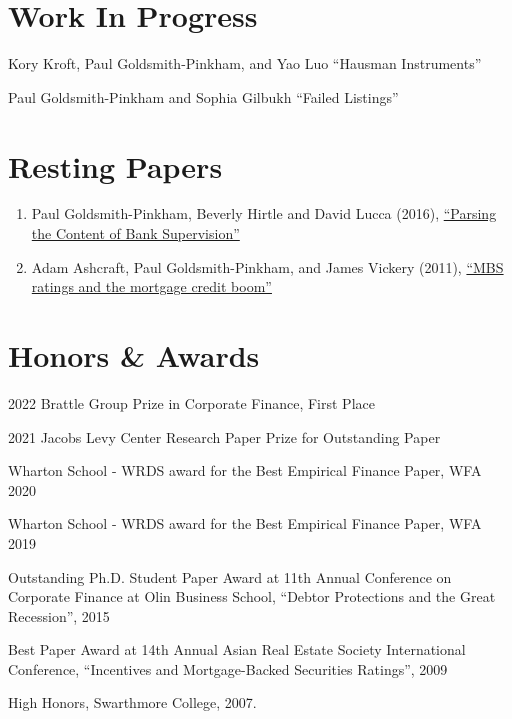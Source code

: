 \documentclass[letterpaper]{article}
\renewenvironment{itemize}{
  \begin{list}{}
    { \setlength{\itemsep}{5pt}
      \setlength{\parsep}{0pt}
      \setlength{\topsep}{0pt}
      \setlength{\leftmargin}{0em} } }{
  \end{list}}
\begin{document}
\section*{Work In Progress}
\begin{itemize}
	\item Kory Kroft, Paul Goldsmith-Pinkham, and Yao Luo ``Hausman Instruments''
	\item Paul Goldsmith-Pinkham and Sophia Gilbukh ``Failed Listings''
\end{itemize}

\section*{Resting Papers}
\begin{enumerate}
	\item Paul Goldsmith-Pinkham, Beverly Hirtle and David Lucca (2016), \href{https://www.newyorkfed.org/research/staff_reports/sr770.html}{``Parsing the Content of Bank Supervision''}
	\item Adam Ashcraft, Paul Goldsmith-Pinkham, and James Vickery (2011), \href{http://papers.ssrn.com/sol3/papers.cfm?abstract_id=1615613}{``MBS ratings and the mortgage credit boom''}
\end{enumerate}

\section*{Honors \& Awards}
\begin{itemize}
	\item 2022 Brattle Group Prize in Corporate Finance, First Place
	\item 2021 Jacobs Levy Center Research Paper Prize for Outstanding Paper
	\item Wharton School - WRDS award for the Best Empirical Finance Paper, WFA 2020
	\item Wharton School - WRDS award for the Best Empirical Finance Paper, WFA 2019
	\item Outstanding Ph.D. Student Paper Award at 11th Annual Conference
	      on Corporate Finance at Olin Business School, ``Debtor Protections
	      and the Great Recession'', 2015
	\item Best Paper Award at 14th Annual Asian Real Estate Society
	      International Conference, ``Incentives and Mortgage-Backed
	      Securities Ratings'', 2009
	\item High Honors, Swarthmore College, 2007.
\end{itemize}
\end{document}

